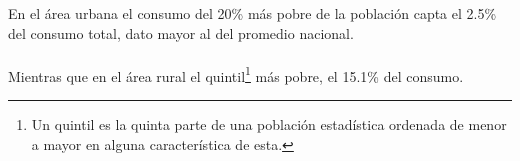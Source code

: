 En el área urbana el consumo del 20\% más pobre de la población    capta  el 2.5\% del consumo total, dato mayor al del promedio nacional.
\\\\ 
Mientras que en el área rural el quintil\footnote{Un quintil es la quinta parte de una población estadística ordenada de menor a mayor en alguna característica de esta.} más pobre,  el 15.1\% del consumo.